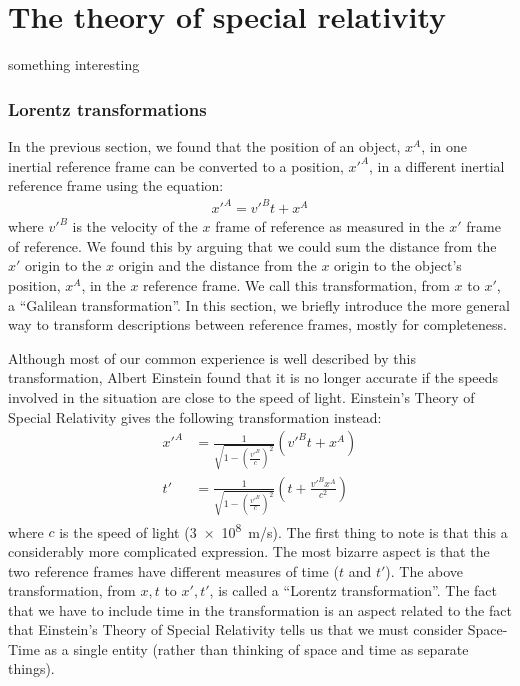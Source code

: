 
\chapter{The theory of special relativity}
\label{chap:N_SpecialRelativity}
 \vspace{1cm}
\begin{learningObjectives}
\item something interesting
\end{learningObjectives}

\subsection{Lorentz transformations}
In the previous section, we found that the position of an object, $x^A$, in one inertial reference frame can be converted to a position, $x'^A$, in a different inertial reference frame using the equation:
\begin{align*}
x'^A=v'^Bt+x^A
\end{align*}
where $v'^B$ is the velocity of the $x$ frame of reference as measured in the $x'$ frame of reference. We found this by arguing that we could sum the distance from the $x'$ origin to the $x$ origin and the distance from the $x$ origin to the object's position, $x^A$, in the $x$ reference frame. We call this transformation, from $x$ to $x'$, a ``Galilean transformation''. In this section, we briefly introduce the more general way to transform descriptions between reference frames, mostly for completeness.

Although most of our common experience is well described by this transformation, Albert Einstein found that it is no longer accurate if the speeds involved in the situation are close to the speed of light. Einstein's Theory of Special Relativity gives the following transformation instead:
\begin{align}
\label{eqn:chap3:LorentzTr}
x'^A&=\frac{1}{\sqrt{1-\left(\frac{v'^B}{c}\right)^2}}(v'^Bt+x^A)\\
t'&=\frac{1}{\sqrt{1-\left(\frac{v'^B}{c}\right)^2}}\left(  t+\frac{v'^Bx^A}{c^2} \right)
\end{align}
where $c$ is the speed of light (\SI{3e8}{m/s}). The first thing to note is that this a considerably more complicated expression. The most bizarre aspect is that the two reference frames have different measures of time ($t$ and $t'$). The above transformation, from $x,t$ to $x',t'$, is called a ``Lorentz transformation''. The fact that we have to include time in the transformation is an aspect related to the fact that Einstein's Theory of Special Relativity tells us that we must consider Space-Time as a single entity (rather than thinking of space and time as separate things).

